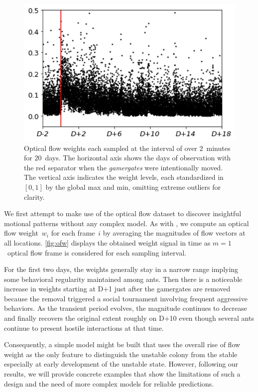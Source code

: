 \documentclass[letterpaper]{article} %
\let\orgautoref\autoref
\providecommand{\Autoref}
{\def\equationautorefname{Equation}%
	\def\figureautorefname{Figure}%
	\def\subfigureautorefname{Figure}%
	\def\Itemautorefname{Item}%
	\def\tableautorefname{Table}%
	\def\exerciseautorefname{Exercise}%
	\def\starexerciseautorefname{Exercise}%
	\def\sectionautorefname{Section}%
	\def\subsectionautorefname{Section}%
	\def\subsubsectionautorefname{Section}%
	\def\chapterautorefname{Section}%
	\def\partautorefname{Part}%
	\orgautoref}
\renewcommand{\autoref}
{\def\equationautorefname{Equation}%
	\def\figureautorefname{Fig.}%
	\def\subfigureautorefname{Fig.}%
	\def\Itemautorefname{item}%
	\def\tableautorefname{Table}%
	\def\exerciseautorefname{Exercise}%
	\def\starexerciseautorefname{Exercise}%
	\def\sectionautorefname{Section}%
	\def\subsectionautorefname{Section}%
	\def\subsubsectionautorefname{Section}%
	\def\chapterautorefname{Section}%
	\def\partautorefname{Part}%
	\orgautoref}
\begin{document}
\begin{figure}[t]
	\centering
	\includegraphics[width=.7\columnwidth]{ofw}
	\caption{
		Optical flow weights each sampled at the interval of 
		over $2$~minutes for $20$~days. 
		The horizontal axis shows the days of observation 
		with the red separator
		when the \emph{gamergates} were intentionally moved.
		The vertical axis indicates the weight levels, each 
		standardized in $[0, 1]$ by the global max and 
		min, omitting extreme outliers for clarity.
	}
	\label{fig:ofw}
\end{figure}
%
We first attempt to make use of the optical flow dataset to discover
insightful motional patterns without any complex model. As with
\citet{MCFT13}, we compute an optical flow weight~$w_i$ for each
frame~$i$ by averaging the magnitudes of flow vectors at all locations.
\Autoref{fig:ofw} displays the obtained weight signal in time as
$m=1$~optical flow frame is considered for each sampling interval.

For the first two days, the weights generally stay in a narrow range
implying some behavioral regularity maintained among ants. Then there is
a noticeable increase in weights starting at D+1 just after the gamergates
are removed because the removal triggered a social
tournament involving frequent aggressive behaviors. As the
transient period evolves, the magnitude continues to decrease and
finally recovers the original extent roughly on D+10 even though
several ants continue to present hostile interactions at that time.

Consequently, a simple model might be built that uses the overall rise
of flow weight as the only feature to distinguish the unstable colony
from the stable especially at early development of the unstable state.
However, following our results, we will provide concrete examples that
show the limitations of such a design and the need of more complex
models for reliable predictions.
\end{document}
